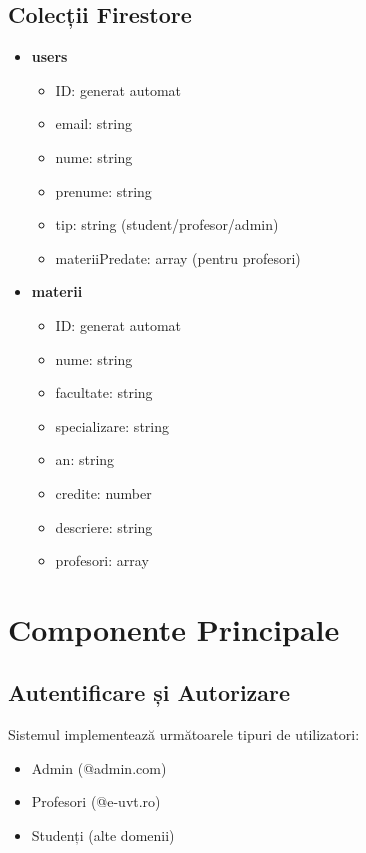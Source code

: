 \documentclass[12pt,a4paper]{article}
\begin{document}
\subsection{Colecții Firestore}
\begin{itemize}
    \item \textbf{users}
    \begin{itemize}
        \item ID: generat automat
        \item email: string
        \item nume: string
        \item prenume: string
        \item tip: string (student/profesor/admin)
        \item materiiPredate: array (pentru profesori)
    \end{itemize}
    
    \item \textbf{materii}
    \begin{itemize}
        \item ID: generat automat
        \item nume: string
        \item facultate: string
        \item specializare: string
        \item an: string
        \item credite: number
        \item descriere: string
        \item profesori: array
    \end{itemize}
\end{itemize}

\section{Componente Principale}
\subsection{Autentificare și Autorizare}
Sistemul implementează următoarele tipuri de utilizatori:
\begin{itemize}
    \item Admin (@admin.com)
    \item Profesori (@e-uvt.ro)
    \item Studenți (alte domenii)
\end{itemize}
\end{document}
